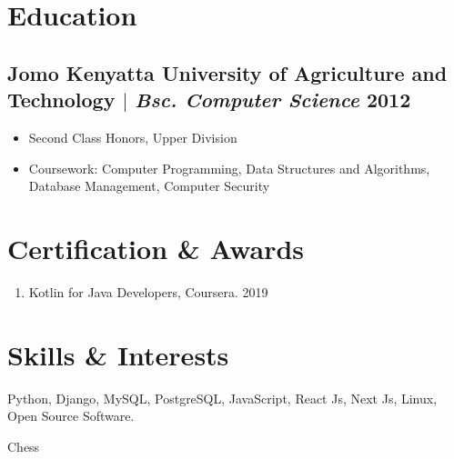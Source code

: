 \documentclass[11pt]{article} %
\begin{document}
\section{Education}
\subsection{Jomo Kenyatta University of Agriculture and Technology $|$ {\normalfont\itshape Bsc. Computer Science} \hfill 2012}
\begin{itemize}
    \item Second Class Honors, Upper Division
    \item Coursework: Computer Programming, Data Structures and Algorithms, Database Management, Computer Security
\end{itemize}


\section{Certification \& Awards}
\begin{enumerate}[label=\null, left=0pt..0pt, itemsep=0pt]
        \item Kotlin for Java Developers, Coursera. \hfill 2019
\end{enumerate}

\section{Skills \& Interests}
\begin{description}[itemsep=0pt]
        \item[Technical] Python, Django, MySQL, PostgreSQL, JavaScript, React Js, Next Js, Linux, Open Source Software. 
        \item[Interests] Chess
\end{description}
\end{document}
